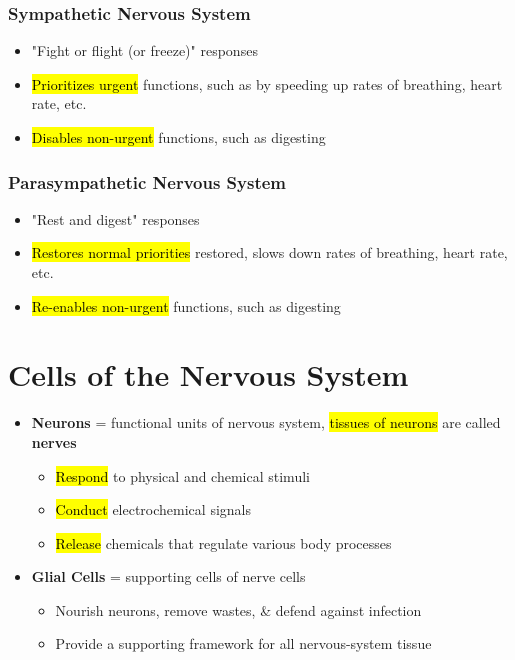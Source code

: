 \documentclass[a4paper,12pt]{article}
\begin{document}
\subsubsection{Sympathetic Nervous System}
\begin{itemize}
    \item{"Fight or flight (or freeze)" responses}
    \item{\hl{Prioritizes urgent} functions, such as by speeding up rates of breathing, heart rate, etc.}
    \item{\hl{Disables non-urgent} functions, such as digesting}
\end{itemize}

\subsubsection{Parasympathetic Nervous System}
\begin{itemize}
    \item{"Rest and digest" responses}
    \item{\hl{Restores normal priorities} restored, slows down rates of breathing, heart rate, etc.}
    \item{\hl{Re-enables non-urgent} functions, such as digesting}
\end{itemize}

\section{Cells of the Nervous System}
\begin{itemize}
    \item{
            \textbf{Neurons} = functional units of nervous system, \hl{tissues of neurons} are called \textbf{nerves}
            \begin{itemize}
                \item{\hl{Respond} to physical and chemical stimuli}
                \item{\hl{Conduct} electrochemical signals}
                \item{\hl{Release} chemicals that regulate various body processes}
            \end{itemize}
        }
    \item{
            \textbf{Glial Cells} = supporting cells of nerve cells
            \begin{itemize}
                \item{Nourish neurons, remove wastes, \& defend against infection}
                \item{Provide a supporting framework for all nervous-system tissue}
            \end{itemize}
        }
\end{itemize}
\end{document}
